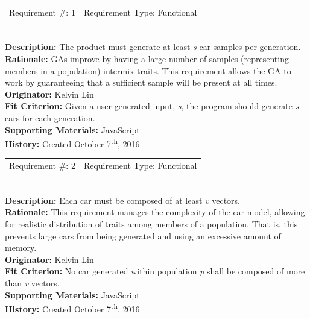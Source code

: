\documentclass[12pt, titlepage]{article}
\begin{document}
\begin{reqbox}
%
\begin{tabular}{cc}
Requirement \#: 1 & Requirement Type: Functional \\
\end{tabular} \\
%
\textbf{Description:} The product must generate at least \textit{s} car samples 
per generation. \\
\textbf{Rationale:}  GAs improve by having a large number of samples 
(representing members in a population) intermix traits. This requirement allows 
the GA to work by guaranteeing that a sufficient sample will be present at all 
times.\\
\textbf{Originator:} Kelvin Lin\\
\textbf{Fit Criterion:} Given a user generated input, \textit{s}, the program 
should generate \textit{s} cars for each generation.\\
%  
\textbf{Supporting Materials:} JavaScript \\
\textbf{History:} Created October 7\textsuperscript{th}, 2016
%
\end{reqbox}

\newpage

\begin{reqbox}
%
\begin{tabular}{cc}
Requirement \#: 2 & Requirement Type: Functional \\
\end{tabular} \\
%
\textbf{Description:} Each car must be composed of at least \textit{v} vectors. 
\\
\textbf{Rationale:}  This requirement manages the complexity of the car model, 
allowing for realistic distribution of traits among members of a population. 
That is, this prevents large cars from being generated and using an excessive 
amount of memory. \\
\textbf{Originator:} Kelvin Lin\\
\textbf{Fit Criterion:} No car generated within population \textit{p} shall be 
composed of more than \textit{v} vectors.\\
%  
\textbf{Supporting Materials:} JavaScript \\
\textbf{History:} Created October 7\textsuperscript{th}, 2016
%
\end{reqbox}
\end{document}
